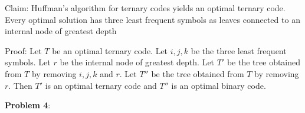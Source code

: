 \documentclass{article} %
\newcommand{\question}[2][]{\begin{flushleft}
        \textbf{Problem #1}: \textit{#2}

\end{flushleft}}
\begin{document}
    Claim: Huffman's algorithm for ternary codes yields an optimal ternary code. Every optimal solution has three least frequent symbols as leaves connected to an internal node of greatest depth

    Proof: Let $T$ be an optimal ternary code. Let $i, j, k$ be the three least frequent symbols. Let $r$ be the internal node of greatest depth. Let $T'$ be the tree obtained from $T$ by removing $i, j, k$ and $r$. Let $T''$ be the tree obtained from $T$ by removing $r$. Then $T'$ is an optimal ternary code and $T''$ is an optimal binary code.


    \newpage

    \question[4]{}
\end{document}
